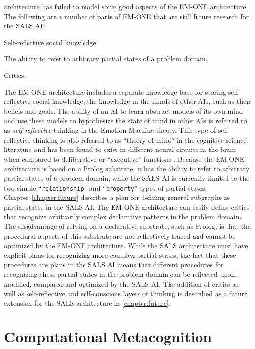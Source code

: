 architecture has failed to model some good aspects of the EM-ONE
architecture.  The following are a number of parts of EM-ONE that are
still future research for the SALS AI:
\begin{packed_enumerate}
\item{Self-reflective social knowledge.}
\item{The ability to refer to arbitrary partial states of a problem
  domain.}
\item{Critics.}
\end{packed_enumerate}
The EM-ONE architecture includes a separate knowledge base for storing
self-reflective social knowledge, the knowledge in the minds of other
AIs, such as their beliefs and goals.  The ability of an AI to learn
abstract models of its own mind and use these models to hypothesize
the state of mind in other AIs is referred to as
{\emph{self-reflective}} thinking in the Emotion Machine theory.  This
type of self-reflective thinking is also referred to as ``theory of
mind'' in the cognitive science literature and has been found to exist
in different neural circuits in the brain when compared to
deliberative or ``executive'' functions \cite[]{saxe:2006}.  Because
the EM-ONE architecture is based on a Prolog substrate, it has the
ability to refer to arbitrary partial states of a problem domain,
while the SALS AI is currently limited to the two simple
``{\tt{relationship}}'' and ``{\tt{property}}'' types of partial
states.  {\mbox{Chapter~\ref{chapter:future}}} describes a plan for
defining general subgraphs as partial states in the SALS AI.  The
EM-ONE architecture can easily define critics that recognize
arbitrarily complex declarative patterns in the problem domain.  The
disadvantage of relying on a declarative substrate, such as Prolog, is
that the procedural aspects of this substrate are not reflectively
traced and cannot be optimized by the EM-ONE architecture.  While the
SALS architecture must have explicit plans for recognizing more
complex partial states, the fact that these procedures are plans in
the SALS AI means that different procedures for recognizing these
partial states in the problem domain can be reflected upon, modified,
compared and optimized by the SALS AI.  The addition of critics as
well as self-reflective and self-conscious layers of thinking is
described as a future extension for the SALS architecture in
{\mbox{\autoref{chapter:future}}}.

\section{Computational Metacognition}

